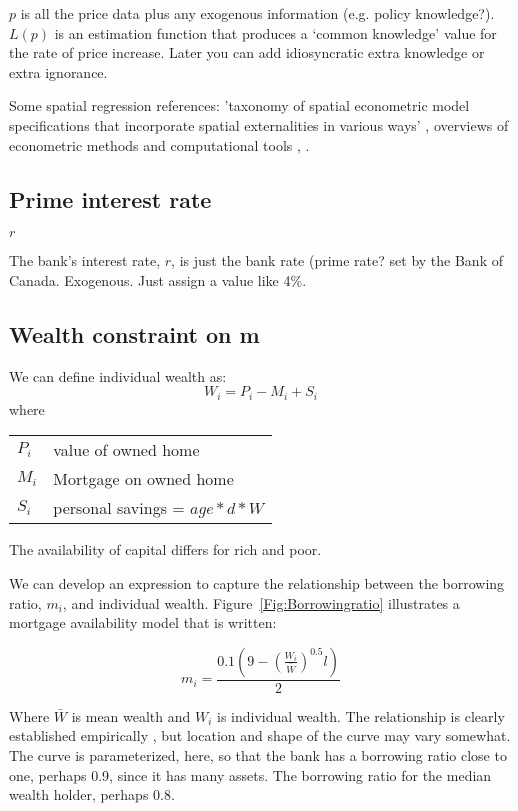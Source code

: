 $p$ is all the price data plus any exogenous information (e.g. policy knowledge?). $L(p)$ is an estimation function that produces a `common knowledge' value for the rate of price increase. Later you can add idiosyncratic extra knowledge or extra ignorance.

Some spatial regression references:
'taxonomy of spatial econometric model specifications that incorporate spatial externalities in various ways'
\cite{anselinSpatialExternalitiesSpatial2003},  
overviews of econometric methods and computational tools \cite{anselinModernSpatialEconometrics2014}, \cite{gelmanDataAnalysisUsing2006}.

\subsection{Prime interest rate}\label{SS:BankRate}
$r$

The bank's interest rate, $r$, is just the bank rate (prime rate? set by the Bank of Canada. Exogenous. Just assign  a value like 4\%.

\subsection{Wealth constraint on m} \label{SS:MWealthConstraint}

We can define individual wealth as:
\[W_i= P_i -M_i  +S_i\]
where 

\begin{tabular}{ll}
$P_i$ & value of owned home\\
$M_i$ & Mortgage on owned home\\
$S_i$ & personal savings = $age*d*W$\\
\end{tabular}

The availability of capital differs for rich and poor. 


We can develop an expression to capture the relationship between the \gls{borrowing ratio}, $m_i$,  and individual wealth. Figure~\ref{Fig:Borrowingratio} illustrates a mortgage availability  model that is written:

 \[ m_i = \frac{0.1 \left(9-\left(\frac{W_i}{\bar W}\right)^{0.5}l\right)}{2} \]

 
Where $\bar{W}$ is mean wealth and $W_i$ is individual wealth. 
The relationship is clearly established empirically \cite{}, but location and shape of the curve may vary somewhat. The curve is parameterized, here, so that the bank has a borrowing ratio close to one, perhaps 0.9, since it has many assets. The borrowing ratio for the median wealth holder, perhaps 0.8.


